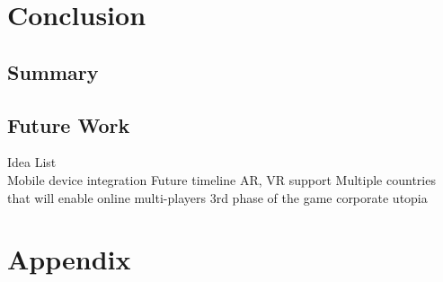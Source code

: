 \documentclass[11pt,titlepage,oneside,openany]{book}
\begin{document}
\chapter{Conclusion}
\label{cha:conclusion}


\section{Summary}
\label{sec:sum}

\section{Future Work}
\label{sec:future}
Idea List\\
Mobile device integration
Future timeline
AR, VR support
Multiple countries that will enable online multi-players
3rd phase of the game corporate utopia




\appendix

\chapter{Appendix}
\label{cha:appendix-a}

\newpage


\pagestyle{empty}
\end{document}

